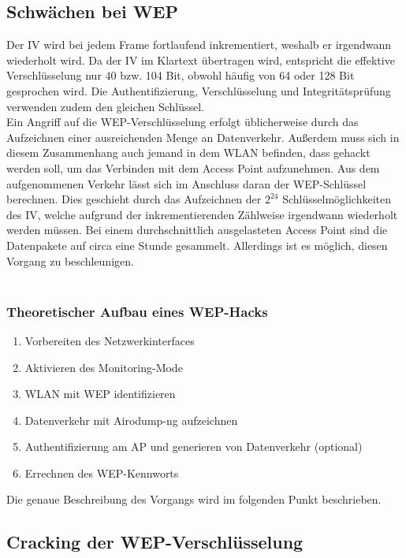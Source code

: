 \subsection{Schwächen bei WEP}
Der IV wird bei jedem Frame fortlaufend inkrementiert, weshalb er irgendwann wiederholt
wird. Da der IV im Klartext übertragen wird, entspricht die effektive Verschlüsselung nur 40 bzw. 104 Bit, obwohl häufig von 64 oder 128 Bit gesprochen wird. Die Authentifizierung, Verschlüsselung und Integritätsprüfung verwenden zudem den gleichen Schlüssel. \\
Ein Angriff auf die WEP-Verschlüsselung erfolgt üblicherweise durch das Aufzeichnen einer
ausreichenden Menge an Datenverkehr. Außerdem muss sich in diesem Zusammenhang auch jemand in dem WLAN befinden, dass gehackt werden soll, um das Verbinden mit dem Access Point aufzunehmen.
Aus dem aufgenommenen Verkehr lässt sich im Anschluss daran der WEP-Schlüssel berechnen. Dies geschieht durch das Aufzeichnen der $2^{24}$ Schlüsselmöglichkeiten des IV, welche aufgrund der inkrementierenden Zählweise irgendwann wiederholt werden müssen. Bei einem durchschnittlich ausgelasteten Access Point sind die Datenpakete auf circa eine Stunde gesammelt. Allerdings ist es möglich, diesen Vorgang zu beschleunigen. \\
\\
\subsubsection{Theoretischer Aufbau eines WEP-Hacks}
\begin{enumerate}
	\item Vorbereiten des Netzwerkinterfaces
	\item Aktivieren des Monitoring-Mode
	\item WLAN mit WEP identifizieren
	\item Datenverkehr mit Airodump-ng aufzeichnen
	\item Authentifizierung am AP und generieren von Datenverkehr (optional)
	\item Errechnen des WEP-Kennworts
\end{enumerate}
Die genaue Beschreibung des Vorgangs wird im folgenden Punkt beschrieben.

\subsection{Cracking der WEP-Verschlüsselung}

